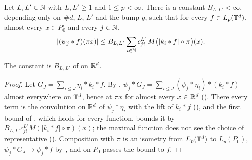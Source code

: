 \begin{theorem}
\label{thm:torus-blocks-by-local-means}
\leanok
{}
Let $L, L' \in \mathbb{N}$ with $L, L' \geq 1$ and $1 \leq p < \infty$. There is a constant
$B_{L,L'} < \infty$, depending only on $\#d$, $L$, $L'$ and the bump $g$, such that for every
$f \in L_p(\mathbb{T}^d)$, almost every $x \in P_0$ and every $j \in \mathbb{N}$,
\[
  |(\psi_j * f)(\pi x)| \leq B_{L,L'} \sum_{i \in \mathbb{N}} c^{L'}_{ji} \,
  M\bigl(|k_i * f| \circ \pi\bigr)(x) .
\]
\end{theorem}

The constant is $B_{L,L'}$ of  on $\mathbb{R}^d$.

\begin{proof}
\leanok
Let $G_J = \sum_{i \leq J} \eta_i * k_i * f$. By ,
$\psi_j * G_J = \sum_{i \leq J} (\psi_j * \eta_i) * (k_i * f)$ almost everywhere on $\mathbb{T}^d$, hence
at $\pi x$ for almost every $x \in \mathbb{R}^d$ (). There every term is the
convolution on $\mathbb{R}^d$ of $\psi_j * \eta_i$ with the lift of $k_i * f$ (),
and the first bound of , which holds for every function, bounds
it by $B_{L,L'} c^{L'}_{ji} M(|k_i * f| \circ \pi)(x)$; the maximal function does not see the
choice of representative (). Composition with $\pi$ is an
isometry from $L_p(\mathbb{T}^d)$ to $L_p(P_0)$, $\psi_j * G_J \to \psi_j * f$ by
, and  on $P_0$ passes the
bound to $f$.
\end{proof}

